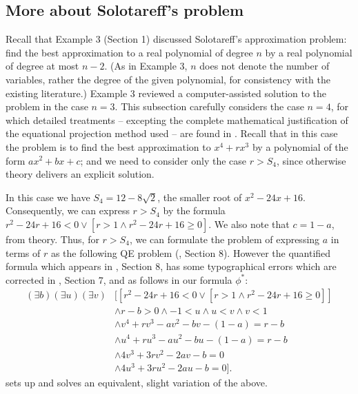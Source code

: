 \documentclass{article}
\begin{document}
\subsection{More about Solotareff's problem}
Recall that Example 3 (Section 1) discussed Solotareff's approximation 
problem: find the best approximation to a real polynomial of
degree $n$ by a real polynomial of degree at most $n-2$.
(As in Example 3, $n$ does not denote the number of variables,
rather the degree of the given polynomial, for consistency
with the existing literature.) Example 3 reviewed a computer-assisted
solution to the problem in the case $n = 3$.
This subsection carefully considers the case $n = 4$,
for which detailed treatments  -- excepting the complete mathematical
justification of the equational projection method used --
are found in \cite{Collins1996, Collins1998}.
Recall that in this case the problem is to find the
best approximation to $x^4 + rx^3$ by a polynomial of the
form $ax^2 + bx + c$; and we need to consider only the case $r > S_4$,
since otherwise theory delivers an explicit solution.

In this case we have $S_4 = 12 - 8 \sqrt{2}$,
the smaller root of $x^2 - 24x + 16$.
Consequently, we can express $r > S_4$ by the formula
$r^2 - 24r + 16 < 0 \vee [r > 1 \wedge r^2 -24r + 16 \ge 0]$.
We also note that $c = 1 - a$, from theory.
Thus, for $r > S_4$, we can formulate the problem of expressing
$a$ in terms of $r$ as the following QE problem (\cite{Collins1998},
Section 8). However the quantified formula which appears in 
\cite{Collins1998}, Section 8, has some typographical errors 
which are corrected
in \cite{McCallum1998}, Section 7, and as follows in our formula $\phi^*$:
\begin{align}
(\exists b)(\exists u)(\exists v) &[[r^2 -24r + 16 < 0
                        \vee [r > 1 \wedge r^2 -24r + 16 \ge 0]]
 \nonumber \\
&\wedge r - b > 0 \wedge -1 < u \wedge u < v \wedge v < 1 
 \nonumber \\
&\wedge v^4 + rv^3 - av^2 - bv - (1-a) = r - b \label{f1}
\\ 
&\wedge u^4 + ru^3 - au^2 - bu - (1-a) = r - b \label{f2}
\\
&\wedge 4v^3 + 3rv^2 - 2av - b = 0 \label{f1'}
\\
&\wedge 4u^3 + 3ru^2 - 2au - b = 0]. \label{f2'}
\end{align}
\cite{Collins1996} sets up and solves an equivalent, 
slight variation of the above.
\end{document}
